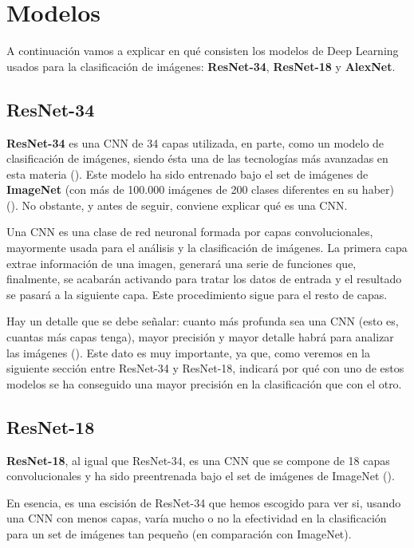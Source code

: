 \section{Modelos}

A continuación vamos a explicar en qué consisten los modelos de Deep Learning usados para la clasificación de imágenes: \textbf{ResNet-34}, \textbf{ResNet-18} y \textbf{AlexNet}.

\subsection{ResNet-34}

\textbf{ResNet-34} es una \ac{CNN} de 34 capas utilizada, en parte, como un modelo de clasificación de imágenes, siendo ésta una de las tecnologías más avanzadas en esta materia (\cite{resnet34}). Este modelo ha sido entrenado bajo el set de imágenes de \textbf{ImageNet} (con más de 100.000 imágenes de 200 clases diferentes en su haber) (\cite{imagenet}). No obstante, y antes de seguir, conviene explicar qué es una \ac{CNN}. %

Una \ac{CNN} es una clase de red neuronal formada por capas convolucionales, mayormente usada para el análisis y la clasificación de imágenes. La primera capa extrae información de una imagen, generará una serie de funciones que, finalmente, se acabarán activando para tratar los datos de entrada y el resultado se pasará a la siguiente capa. Este procedimiento sigue para el resto de capas.

Hay un detalle que se debe señalar: cuanto más profunda sea una \ac{CNN} (esto es, cuantas más capas tenga), mayor precisión y mayor detalle habrá para analizar las imágenes (\cite{cnn}). Este dato es muy importante, ya que, como veremos en la siguiente sección entre ResNet-34 y ResNet-18, indicará por qué con uno de estos modelos se ha conseguido una mayor precisión en la clasificación que con el otro. %

\subsection{ResNet-18}

\textbf{ResNet-18}, al igual que ResNet-34, es una \ac{CNN} que se compone de 18 capas convolucionales y ha sido preentrenada bajo el set de imágenes de ImageNet (\cite{resnet18}).

En esencia, es una escisión de ResNet-34 que hemos escogido para ver si, usando una \ac{CNN} con menos capas, varía mucho o no la efectividad en la clasificación para un set de imágenes tan pequeño (en comparación con ImageNet).

